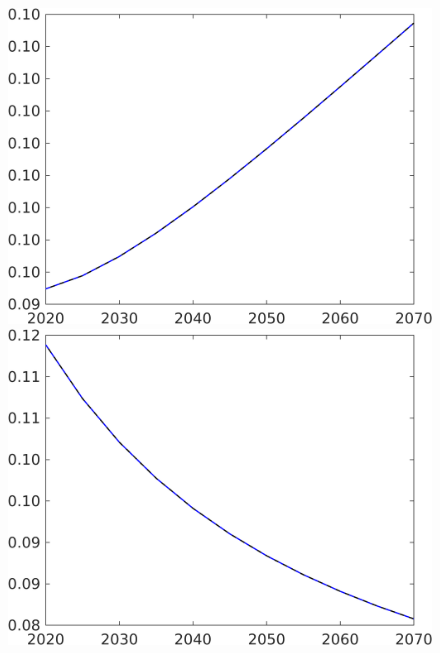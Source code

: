 \begin{figure}[h!!]
\begin{minipage}[]{0.32\textwidth}
	\end{minipage}
	\begin{minipage}[]{0.32\textwidth}
		\includegraphics[width=1\textwidth]{../../codding_model/own_basedOnFried/optimalPol_190722_tidiedUp/figures/all_10Aout22/CountTaul_modnsk_target_sff_spillover0_sep1_extern0_PV1_etaa0.79_lgd0.png}
	\end{minipage}
	\begin{minipage}[]{0.32\textwidth}
		\includegraphics[width=1\textwidth]{../../codding_model/own_basedOnFried/optimalPol_190722_tidiedUp/figures/all_10Aout22/CountTaul_modnsk_target_sg_spillover0_sep1_extern0_PV1_etaa0.79_lgd0.png}

\end{minipage}
\end{figure}
